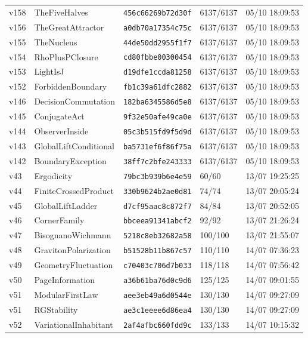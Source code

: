 \documentclass[11pt]{article}
\theoremstyle{definition}\newtheorem{deriv}{Derivation}
\begin{document}
{\begin{longtable}{@{}lllll@{}}
v158 & TheFiveHalves & \texttt{456c66269b72d30f} & 6137/6137 & 05/10 18:09:53 \\
v156 & TheGreatAttractor & \texttt{a0db70a17354c75c} & 6137/6137 & 05/10 18:09:53 \\
v155 & TheNucleus & \texttt{44de50dd2955f1f7} & 6137/6137 & 05/10 18:09:53 \\
v154 & RhoPlusPClosure & \texttt{cd80fbbe00300454} & 6137/6137 & 05/10 18:09:53 \\
v153 & LightIsJ & \texttt{d19dfe1ccda81258} & 6137/6137 & 05/10 18:09:53 \\
v152 & ForbiddenBoundary & \texttt{fb1c39a61dfc2882} & 6137/6137 & 05/10 18:09:53 \\
v146 & DecisionCommutation & \texttt{182ba6345586d5e8} & 6137/6137 & 05/10 18:09:53 \\
v145 & ConjugateAct & \texttt{9f32e50afe49ca0e} & 6137/6137 & 05/10 18:09:53 \\
v144 & ObserverInside & \texttt{05c3b515fd9f5d9d} & 6137/6137 & 05/10 18:09:53 \\
v143 & GlobalLiftConditional & \texttt{ba5731ef6f86f75a} & 6137/6137 & 05/10 18:09:53 \\
v142 & BoundaryException & \texttt{38ff7c2bfe243333} & 6137/6137 & 05/10 18:09:53 \\
v43 & Ergodicity & \texttt{79bc3b939b6e4e59} & 60/60 & 13/07 19:25:25 \\
v44 & FiniteCrossedProduct & \texttt{330b9624b2ae0d81} & 74/74 & 13/07 20:05:24 \\
v45 & GlobalLiftLadder & \texttt{d7cf95aac8c872f7} & 84/84 & 13/07 20:52:05 \\
v46 & CornerFamily & \texttt{bbceea91341abcf2} & 92/92 & 13/07 21:26:24 \\
v47 & BisognanoWichmann & \texttt{5218c8eb32682a58} & 100/100 & 13/07 21:55:07 \\
v48 & GravitonPolarization & \texttt{b51528b11b867c57} & 110/110 & 14/07 07:36:23 \\
v49 & GeometryFluctuation & \texttt{c70403c706d7b033} & 118/118 & 14/07 07:56:42 \\
v50 & PageInformation & \texttt{a36b61ba76d0c9d6} & 125/125 & 14/07 09:01:55 \\
v51 & ModularFirstLaw & \texttt{aee3eb49a6d0544e} & 130/130 & 14/07 09:27:09 \\
v51 & RGStability & \texttt{ae3c1eeee6d86ea4} & 130/130 & 14/07 09:27:09 \\
v52 & VariationalInhabitant & \texttt{2af4afbc660fdd9c} & 133/133 & 14/07 10:15:32 \\

\end{longtable}}
\end{document}
